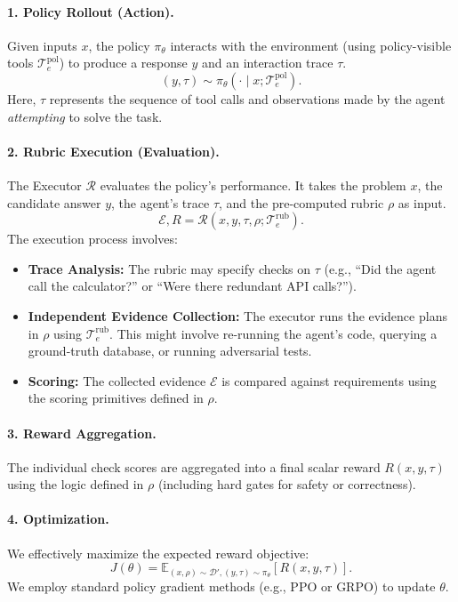 \paragraph{1. Policy Rollout (Action).}
Given inputs $x$, the policy $\pi_\theta$ interacts with the environment (using policy-visible tools $\mathcal{T}_e^{\text{pol}}$) to produce a response $y$ and an interaction trace $\tau$.
\begin{equation}
(y, \tau) \sim \pi_\theta(\cdot \mid x; \mathcal{T}_e^{\text{pol}}).
\end{equation}
Here, $\tau$ represents the sequence of tool calls and observations made by the agent \textit{attempting} to solve the task.

\paragraph{2. Rubric Execution (Evaluation).}
The Executor $\mathcal{R}$ evaluates the policy's performance. It takes the problem $x$, the candidate answer $y$, the agent's trace $\tau$, and the pre-computed rubric $\rho$ as input.
\begin{equation}
\mathcal{E}, R = \mathcal{R}(x, y, \tau, \rho; \mathcal{T}_e^{\text{rub}}).
\end{equation}
The execution process involves:
\begin{itemize}
    \item \textbf{Trace Analysis:} The rubric may specify checks on $\tau$ (e.g., ``Did the agent call the calculator?'' or ``Were there redundant API calls?'').
    \item \textbf{Independent Evidence Collection:} The executor runs the evidence plans in $\rho$ using $\mathcal{T}_e^{\text{rub}}$. This might involve re-running the agent's code, querying a ground-truth database, or running adversarial tests.
    \item \textbf{Scoring:} The collected evidence $\mathcal{E}$ is compared against requirements using the scoring primitives defined in $\rho$.
\end{itemize}

\paragraph{3. Reward Aggregation.}
The individual check scores are aggregated into a final scalar reward $R(x, y, \tau)$ using the logic defined in $\rho$ (including hard gates for safety or correctness).

\paragraph{4. Optimization.}
We effectively maximize the expected reward objective:
\begin{equation}
J(\theta) = \mathbb{E}_{(x, \rho) \sim \mathcal{D}', (y, \tau) \sim \pi_\theta}[R(x, y, \tau)].
\end{equation}
We employ standard policy gradient methods (e.g., PPO or GRPO) to update $\theta$.


